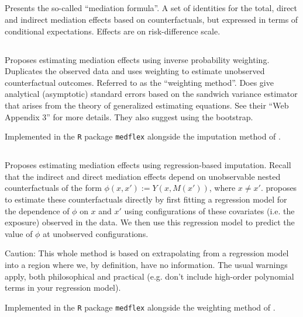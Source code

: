 \documentclass{report}
\begin{document}
\subsection{\citet{Pea12}}

Presents the so-called ``mediation formula''. A set of identities for the total, direct and indirect mediation effects based on counterfactuals, but expressed in terms of conditional expectations. Effects are on risk-difference scale.

\subsection{\citet{Lan12}}

Proposes estimating mediation effects using inverse probability weighting. Duplicates the observed data and uses weighting to estimate unobserved counterfactual outcomes. Referred to as the ``weighting method''. Does give analytical (asymptotic) standard errors based on the sandwich variance estimator that arises from the theory of generalized estimating equations. See their ``Web Appendix 3'' for more details. They also suggest using the bootstrap. 

Implemented in the \texttt{R} package \texttt{medflex} \citep{Ste17} alongside the imputation method of \citet{Van12}.

\subsection{\citet{Van12}}

Proposes estimating mediation effects using regression-based imputation. Recall that the indirect and direct mediation effects depend on unobservable nested counterfactuals of the form $\phi(x, x') := Y(x, M(x'))$, where $x \neq x'$. \citet{Van12} proposes to estimate these counterfactuals directly by first fitting a regression model for the dependence of $\phi$ on $x$ and $x'$ using configurations of these covariates (i.e. the exposure) observed in the data. We then use this regression model to predict the value of $\phi$ at unobserved configurations.

Caution: This whole method is based on extrapolating from a regression model into a region where we, by definition, have no information. The usual warnings apply, both philosophical and practical (e.g. don't include high-order polynomial terms in your regression model).

Implemented in the \texttt{R} package \texttt{medflex} \citep{Ste17} alongside the weighting method of \citet{Lan12}.
\end{document}
